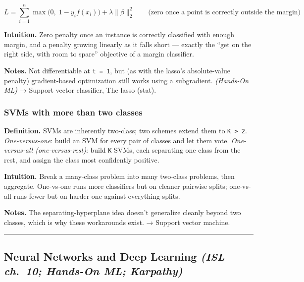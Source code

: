 \documentclass[
  10pt,
  letterpaper,
  onecolumn]{article}
\begin{document}
\begin{equation*}
L=\sum_{i=1}^{n}\max\bigl(0,\;1-y_i f(x_i)\bigr)+\lambda\|\beta\|_2^2
\qquad\text{(zero once a point is correctly outside the margin)}
\end{equation*}

\textbf{Intuition.} Zero penalty once an instance is correctly
classified with enough margin, and a penalty growing linearly as it
falls short --- exactly the ``get on the right side, with room to
spare'' objective of a margin classifier.

\textbf{Notes.} Not differentiable at \texttt{t\ =\ 1}, but (as with the
lasso's absolute-value penalty) gradient-based optimization still works
using a subgradient. \emph{(Hands-On ML)} → Support vector classifier,
The lasso (stat).

\hypertarget{svms-with-more-than-two-classes}{%
\subsubsection{SVMs with more than two
classes}\label{svms-with-more-than-two-classes}}

\textbf{Definition.} SVMs are inherently two-class; two schemes extend
them to \texttt{K\ \textgreater{}\ 2}. \emph{One-versus-one}: build an
SVM for every pair of classes and let them vote. \emph{One-versus-all
(one-versus-rest)}: build \texttt{K} SVMs, each separating one class
from the rest, and assign the class most confidently positive.

\textbf{Intuition.} Break a many-class problem into many two-class
problems, then aggregate. One-vs-one runs more classifiers but on
cleaner pairwise splits; one-vs-all runs fewer but on harder
one-against-everything splits.

\textbf{Notes.} The separating-hyperplane idea doesn't generalize
cleanly beyond two classes, which is why these workarounds exist. →
Support vector machine.

\begin{center}\rule{0.5\linewidth}{0.5pt}\end{center}

\hypertarget{neural-networks-and-deep-learning-isl-ch.-10-hands-on-ml-karpathy}{%
\subsection{\texorpdfstring{Neural Networks and Deep Learning \emph{(ISL
ch.~10; Hands-On ML;
Karpathy)}}{Neural Networks and Deep Learning (ISL ch.~10; Hands-On ML; Karpathy)}}\label{neural-networks-and-deep-learning-isl-ch.-10-hands-on-ml-karpathy}}
\end{document}
